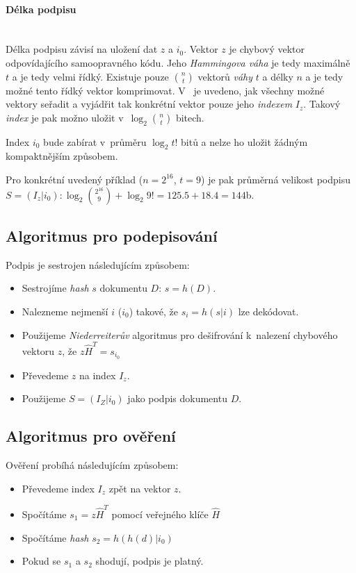 \documentclass[thesis=M,czech,hidelinks]{FITthesis}[2012/06/26]
\newcommand{\0}{{\textcolor[gray]{0.80}{0}}}
\begin{document}
\paragraph{Délka podpisu} \hfil \\
Délka podpisu závisí na uložení dat $z$ a $i_0$. Vektor $z$ je chybový vektor
odpovídajícího samoopravného kódu. Jeho \emph{Hammingova váha} je tedy maximálně
$t$ a je tedy velmi řídký. Existuje pouze $\binom{n}{t}$ vektorů \emph{váhy} $t$ a
délky $n$ a je tedy možné tento řídký vektor komprimovat. V~\cite{Courtois} je
uvedeno, jak všechny možné vektory seřadit a vyjádřit tak konkrétní vektor pouze
jeho \emph{indexem} $I_z$. Takový \emph{index} je pak možno uložit
v~$\log_2{\binom{n}{t}}$ bitech.

Index $i_0$ bude zabírat v~průměru $\log_2{t!}$ bitů a nelze ho uložit žádným
kompaktnějším způsobem.

Pro konkrétní uvedený příklad ($n=2^{16}$, $t=9$) je pak průměrná velikost
podpisu $S = ( I_z | i_0 ): \log_2{\binom{2^{16}}{9}} + \log_2{9!} = 125.5 + 18.4 =
144$\;b.

\subsection{Algoritmus pro podepisování}
Podpis je sestrojen následujícím způsobem:

\begin{itemize}
    \item Sestrojíme \emph{hash} $s$ dokumentu $D$: $s = h(D)$.
    \item Nalezneme nejmenší $i$ ($i_0$) takové, že $s_i = h(s|i)$ lze dekódovat.
    \item Použijeme \emph{Niederreiterův} algoritmus pro dešifrování k~nalezení
        chybového vektoru $z$, že $z\hat{H}^T = s_{i_0}$
    \item Převedeme $z$ na index $I_z$.
    \item Použijeme $S=(I_Z|i_0)$ jako podpis dokumentu $D$.
\end{itemize}

\subsection{Algoritmus pro ověření}
Ověření probíhá následujícím způsobem:

\begin{itemize}
    \item Převedeme index $I_z$ zpět na vektor $z$.
    \item Spočítáme $s_1 = z\hat{H}^T$ pomocí veřejného klíče $\hat{H}$
    \item Spočítáme \emph{hash} $s_2 = h(h(d)|i_0)$
    \item Pokud se $s_1$ a $s_2$ shodují, podpis je platný.
\end{itemize}
\end{document}
